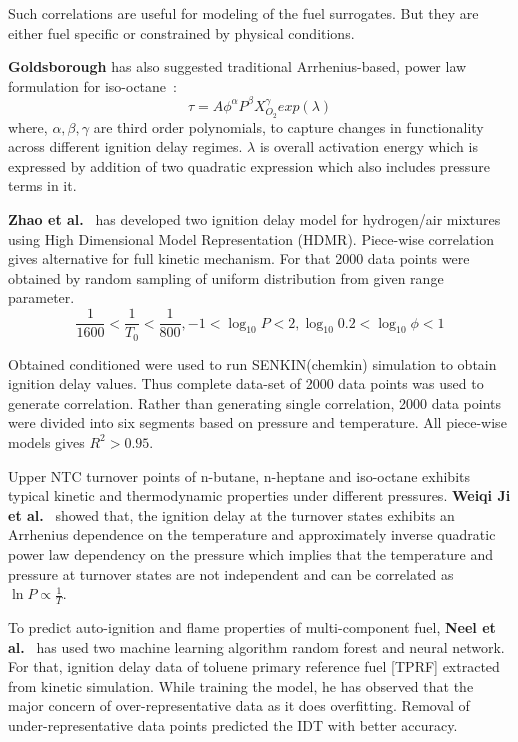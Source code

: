 \documentclass[preprint,12pt]{elsarticle}
\begin{document}
		Such correlations are useful for modeling of the fuel surrogates. But they are either fuel specific or constrained by physical conditions. 
		
		
		\textbf{Goldsborough} has also suggested traditional Arrhenius-based, power law formulation for iso-octane~\cite{goldsborough2009chemical}:
		\begin{equation}
		\tau = A \phi^\alpha P^\beta X_{O_2}^\gamma exp(\lambda)
		\end{equation}
		where, $\alpha, \beta, \gamma$ are third order polynomials, to capture changes in functionality across different ignition delay regimes. $\lambda$ is overall activation energy which is expressed by addition of two quadratic expression which also includes pressure terms in it. 
		
		\textbf{Zhao et al.}~\cite{zhao2011correlations} has developed two ignition delay model for hydrogen/air mixtures using High Dimensional Model Representation (HDMR). Piece-wise correlation gives alternative for full kinetic mechanism. For that 2000 data points were obtained by random sampling of uniform distribution from given range parameter.
		\begin{equation}
		\frac{1}{1600}<\frac{1}{T_0}<\frac{1}{800},  -1<\log_{10}P<2,    \log_{10}0.2<\log_{10}\phi<1
		\end{equation}
				
		Obtained conditioned were used to run SENKIN(chemkin) simulation to obtain ignition delay values. Thus complete data-set of 2000 data points was used to generate correlation. Rather than generating single correlation, 2000 data points were divided into six segments based on pressure and temperature. All piece-wise models gives $R^2>0.95$.
		
		Upper NTC turnover points of n-butane, n-heptane and iso-octane exhibits typical kinetic and thermodynamic  properties under different pressures.  \textbf{Weiqi Ji et al.}~\cite{ji2016controlling} showed that, the ignition delay at the turnover states exhibits an Arrhenius dependence on the temperature and approximately inverse quadratic power law dependency on the pressure which implies that the temperature and pressure at turnover states are not independent and	can be correlated as $\ln P \propto \frac{1}{T}$.
		
		To predict auto-ignition and flame properties of multi-component fuel, \textbf{Neel et al.}~\cite{shah2019prediction} has used two machine learning algorithm random forest and neural network. For that, ignition delay data of toluene primary reference fuel [TPRF] extracted from kinetic simulation. While training the model, he has observed that the major concern of over-representative data as it does overfitting. Removal of  under-representative data points predicted the IDT with better accuracy. 
		
\end{document}
